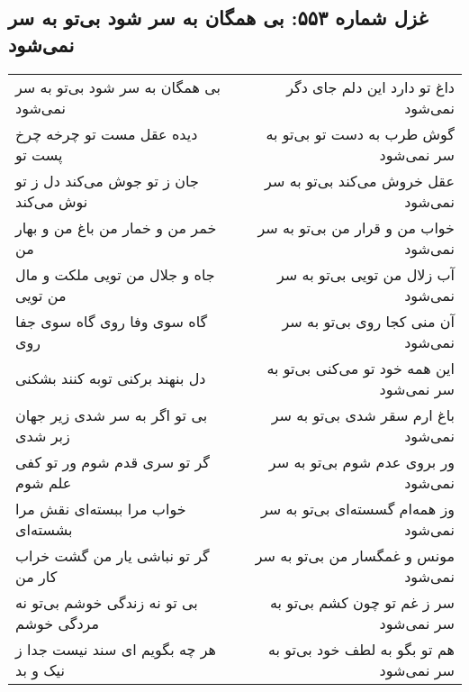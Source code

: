 \begin{center}
\section*{غزل شماره ۵۵۳: بی همگان به سر شود بی‌تو به سر نمی‌شود}
\label{sec:0553}
\begin{longtable}{l p{0.5cm} r}
بی همگان به سر شود بی‌تو به سر نمی‌شود
&&
داغ تو دارد این دلم جای دگر نمی‌شود
\\
دیده عقل مست تو چرخه چرخ پست تو
&&
گوش طرب به دست تو بی‌تو به سر نمی‌شود
\\
جان ز تو جوش می‌کند دل ز تو نوش می‌کند
&&
عقل خروش می‌کند بی‌تو به سر نمی‌شود
\\
خمر من و خمار من باغ من و بهار من
&&
خواب من و قرار من بی‌تو به سر نمی‌شود
\\
جاه و جلال من تویی ملکت و مال من تویی
&&
آب زلال من تویی بی‌تو به سر نمی‌شود
\\
گاه سوی وفا روی گاه سوی جفا روی
&&
آن منی کجا روی بی‌تو به سر نمی‌شود
\\
دل بنهند برکنی توبه کنند بشکنی
&&
این همه خود تو می‌کنی بی‌تو به سر نمی‌شود
\\
بی تو اگر به سر شدی زیر جهان زبر شدی
&&
باغ ارم سقر شدی بی‌تو به سر نمی‌شود
\\
گر تو سری قدم شوم ور تو کفی علم شوم
&&
ور بروی عدم شوم بی‌تو به سر نمی‌شود
\\
خواب مرا ببسته‌ای نقش مرا بشسته‌ای
&&
وز همه‌ام گسسته‌ای بی‌تو به سر نمی‌شود
\\
گر تو نباشی یار من گشت خراب کار من
&&
مونس و غمگسار من بی‌تو به سر نمی‌شود
\\
بی تو نه زندگی خوشم بی‌تو نه مردگی خوشم
&&
سر ز غم تو چون کشم بی‌تو به سر نمی‌شود
\\
هر چه بگویم ای سند نیست جدا ز نیک و بد
&&
هم تو بگو به لطف خود بی‌تو به سر نمی‌شود
\\
\end{longtable}
\end{center}

